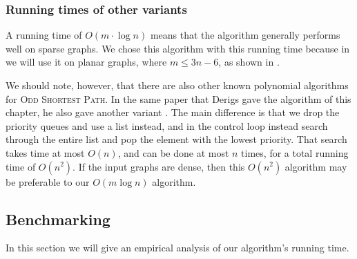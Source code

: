 \subsubsection*{Running times of other variants}
A running time of $O(m \cdot \log n)$ means that the algorithm generally performs well on sparse graphs. We chose this algorithm with this running time because in  we will use it on planar graphs, where $m \leq 3n-6$, as shown in .

We should note, however, that there are also other known polynomial algorithms for \textsc{Odd Shortest Path}. In the same paper that Derigs gave the algorithm of this chapter, he also gave another variant \cite{source:derigs_shortest_odd_path}. The main difference is that we drop the priority queues and use a list instead, and in the control loop instead search through the entire list and pop the element with the lowest priority. That search takes time at most $O(n)$, and can be done at most $n$ times, for a total running time of $O(n^2)$. If the input graphs are dense, then this $O(n^2)$ algorithm may be preferable to our $O(m \log n)$ algorithm.

\subsection{Benchmarking}
In this section we will give an empirical analysis of our algorithm's running time.

